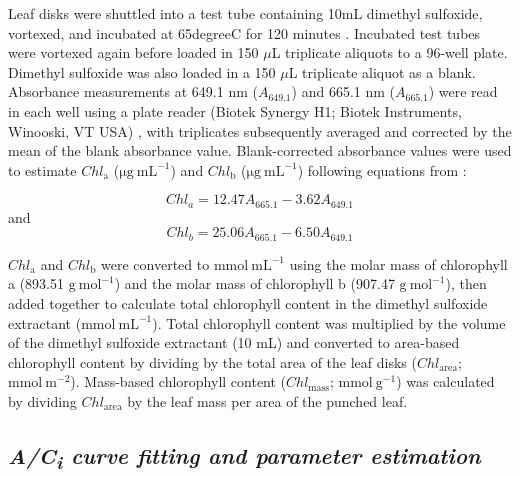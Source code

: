     Leaf disks were shuttled into a test tube containing 10mL dimethyl sulfoxide, vortexed, and incubated at 65\text degree{}C for 120 minutes . Incubated test tubes were vortexed again before loaded in 150 $\mu$L triplicate aliquots to a 96-well plate. Dimethyl sulfoxide was also loaded in a 150 $\mu$L triplicate aliquot as a blank. Absorbance measurements at 649.1 nm ($A_{649.1}$) and 665.1 nm ($A_{665.1}$) were read in each well using a plate reader (Biotek Synergy H1; Biotek Instruments, Winooski, VT USA) , with triplicates subsequently averaged and corrected by the mean of the blank absorbance value. Blank-corrected absorbance values were used to estimate $Chl_\mathrm{a}$ ($\mathrm{\mu g\ mL^{-1}}$) and $Chl_\mathrm{b}$ ($\mathrm{\mu g\ mL^{-1}}$) following equations from :

    \begin{equation} \label{eq_5.1}
        Chl_{a}=12.47A_{665.1}-3.62A_{649.1}
    \end{equation}
    \noindent and
    \begin{equation} \label{eq_5.2}
        Chl_{b}=25.06A_{665.1}-6.50A_{649.1}
    \end{equation}
    
    \noindent $Chl_\mathrm{a}$ and $Chl_\mathrm{b}$ were converted to $\mathrm{mmol\ mL^{-1}}$ using the molar mass of chlorophyll a (893.51 $\mathrm{g\ mol^{-1}}$) and the molar mass of chlorophyll b (907.47 $\mathrm{g\ mol^{-1}}$), then added together to calculate total chlorophyll content in the dimethyl sulfoxide extractant ($\mathrm{mmol\ mL^{-1}}$). Total chlorophyll content was multiplied by the volume of the dimethyl sulfoxide extractant (10 mL) and converted to area-based chlorophyll content by dividing by the total area of the leaf disks ($Chl_\mathrm{area}$; $\mathrm{mmol\ m^{-2}}$). Mass-based chlorophyll content ($Chl_\mathrm{mass}$; $\mathrm{mmol\ g^{-1}}$) was calculated by dividing $Chl_\mathrm{area}$ by the leaf mass per area of the punched leaf.

    \subsection{\textit{A/C\textsubscript{i} curve fitting and parameter estimation}}

